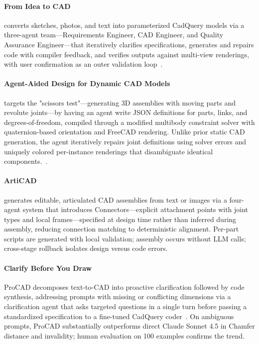 \paragraph{From Idea to CAD}
converts sketches, photos, and text into parameterized CadQuery models via a three-agent team—Requirements Engineer, CAD Engineer, and Quality Assurance Engineer—that iteratively clarifies specifications, generates and repairs code with compiler feedback, and verifies outputs against multi-view renderings, with user confirmation as an outer validation loop~\cite{ocker2025ideatocad}.

\paragraph{Agent-Aided Design for Dynamic CAD Models} targets the "scissors test"—generating 3D assemblies with moving parts and revolute joints—by having an agent write JSON definitions for parts, links, and degrees-of-freedom, compiled through a modified multibody constraint solver with quaternion-based orientation and FreeCAD rendering. Unlike prior static CAD generation, the agent iteratively repairs joint definitions using solver errors and uniquely colored per-instance renderings that disambiguate identical components.~\cite{avg260415184}.

\paragraph{ArtiCAD}
 generates editable, articulated CAD assemblies from text or images via a four-agent system that introduces Connectors—explicit attachment points with joint types and local frames—specified at design time rather than inferred during assembly, reducing connection matching to deterministic alignment. Per-part scripts are generated with local validation; assembly occurs without LLM calls; cross-stage rollback isolates design versus code errors.~\cite{avg260410992}

\paragraph{Clarify Before You Draw}
ProCAD decomposes text-to-CAD into proactive clarification followed by code synthesis, addressing prompts with missing or conflicting dimensions via a clarification agent that asks targeted questions in a single turn before passing a standardized specification to a fine-tuned CadQuery coder~\cite{avg260203045}. On ambiguous prompts, ProCAD substantially outperforms direct Claude Sonnet 4.5 in Chamfer distance and invalidity; human evaluation on 100 examples confirms the trend. 

